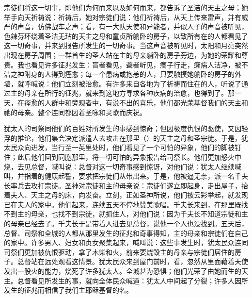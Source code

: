 宗徒们将这一切事，即他们为何而来以及如何而来，都告诉了圣洁的天主之母；她举手向天祈祷说：祈祷后，她对宗徒们说：他们祈祷后，从天上传来雷声，并有威严的声音，仿佛战车之声；看，有一大队天使和异能者，并似人子的声音被听见，色辣芬环绕着圣洁无玷的天主之母和童贞所躺卧的房子，以致所有在的人都看见了这一切奇事，并来到报告所发生的一切奇事。当这声音被听见时，太阳和月亮突然出现在房子周围；一群首生的圣人站在主的母亲躺卧的房子旁边，为她的荣耀和尊贵。我也看见许多征兆发生：盲者看见，聋者听见，瘸子行走，癞病人洁净，被不洁之神附身的人得到痊愈；每一个患病或抱恙的人，只要触摸她躺卧的房子的外墙，就呼喊说：他们立刻被治愈。有许多来自各地为了祈祷而住在的人，听说了通过主的母亲在所行的征兆，就来到这地方寻求各种疾病的治愈，也得到了。那一天，在痊愈的人群中和旁观者中，有说不出的喜乐，他们都光荣基督我们的天主和祂的母亲。整个连同都因着圣咏和灵歌而庆祝。\par

犹太人的司祭同他们的百姓对所发生的事感到惊奇；但因极度仇恨的驱使，又因轻浮的推论，他们集会决定派遣人去攻击在那里（）的天主之母和圣宗徒。于是，犹太民众向进发，当行至一英里处时，他们看见了一个可怕的异象，他们的脚被钉住；此后他们回到同胞那里，将一切可怕的异象报告给司祭长。他们更加怒火中烧，去见总督，喊叫说：总督对这一切奇事感到惊讶，对他们说：犹太人继续喊叫，并指着的健康起誓，要求把宗徒们从带出来。于是，他被逼无奈，派一名千夫长率兵去攻打宗徒。圣神对宗徒和主的母亲说：宗徒们遂立即起身，走出屋子，抬着夫人、天主之母的床，向发奋。立刻，正如圣神所说，他们被云彩举起，就发现已在夫人的家中。他们起来，连续五天不停地赞美歌唱。千夫长来到，在那里既找不到主的母亲，也找不到宗徒，就抓住人，对他们说：因为千夫长不知道宗徒和主的母亲已经去了。千夫长于是带着人进去见总督，说他一个人也没找到。五天后，总督、司祭和全城的人都从那里发生的征兆和奇事得知，主的母亲和宗徒们在自己的家中。许多男人、妇女和贞女聚集起来，喊叫说：这些事发生时，犹太民众连同司祭们更加被仇恨驱动，拿了木柴和火，前来要烧毁主的母亲与宗徒们居住的房子。总督站在远处观看这情景。犹太民众来到屋门前时，看，忽然从里面藉着天使发出一股火的能力，烧死了许多犹太人。全城甚为恐惧；他们光荣了由她而生的天主。总督看见所发生的事，就向全体民众喊道：犹太人中间起了分裂；许多人因所发生的征兆而相信了我们主耶稣基督的名。\par

